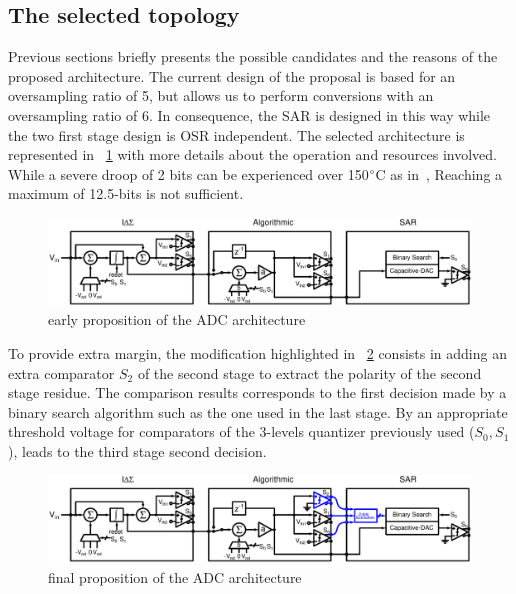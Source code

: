 \subsection{The selected topology}
\label{sec:selected-topology}
Previous sections briefly presents the possible candidates and the reasons of the proposed architecture. The current design of the proposal is based for an oversampling ratio of 5, but allows us to perform conversions with an oversampling ratio of 6. In consequence, the SAR is designed in this way while the two first stage design is OSR independent. The selected architecture is represented in \figurename~\ref{fig:early-prop-adc-architecture} with more details about the operation and resources involved. While a severe droop of 2 bits can be experienced over 150\(\degree \)C as in~\cite{Ericson2004}, Reaching a maximum of 12.5-bits is not sufficient.

\begin{figure}[htp]
	\centering
	\includegraphics[width=\textwidth]{Chapter4/Figs/architecture-full-principle.ps}
	\caption{early proposition of the ADC architecture}
	\label{fig:early-prop-adc-architecture}
\end{figure}

To provide extra margin, the modification highlighted in \figurename~\ref{fig:final-prop-adc-architecture} consists in adding an extra comparator \(S_2\) of the second stage to extract the polarity of the second stage residue. The comparison results corresponds to the first decision made by a binary search algorithm such as the one used in the last stage. By an appropriate threshold voltage for comparators of the 3-levels quantizer previously used (\(S_0, S_1 \)), leads to the third stage second decision.

\begin{figure}[htp]
	\centering
	\includegraphics[width=\textwidth]{Chapter4/Figs/architecture-full-principle-final.ps}
	\caption{final proposition of the ADC architecture}
	\label{fig:final-prop-adc-architecture}
\end{figure}

